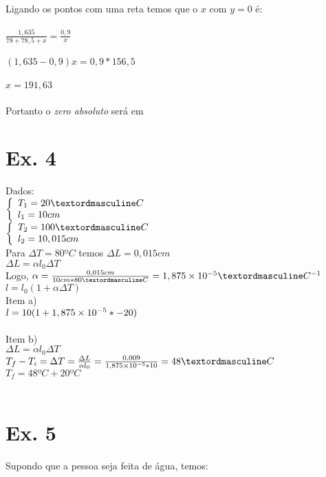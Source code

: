 Ligando os pontos com uma reta temos que o $x$ com $y=0$ é: \\ \\
$\frac{1,635}{78+78,5+x} = \frac{0,9}{x}$ \\ \\
$(1,635-0,9)x = 0,9 * 156,5$\\ \\
$x = 191,63$\\ \\

Portanto o \textit{zero absoluto} será em \\

\section{Ex. 4}

Dados: \\
$ \left\{
	  \begin{array}{l l}
		  T_{1} = 20ºC \\
		  l_{1}=10cm \\
	  \end{array}
  \right.
$ \\
$ \left\{
  	\begin{array}{l l}
		  T_{2} = 100ºC \\
		  l_{2}=10,015cm \\
	  \end{array}
  \right.
$ \\

Para $\Delta T=80ºC$ temos $\Delta L=0,015cm$\\
$\Delta L = \alpha l_{0}\Delta T$\\
Logo, $\alpha = \frac{0,015cm}{10cm*80ºC} = 1,875\e{-5}ºC^{-1}$\\
$ l = l_{0}(1 + \alpha\Delta T)$\\
Item a)\\
$l = 10(1+1,875\times 10^{-5}*-20)$\\
\\
Item b)\\
$\Delta L = \alpha l_{0}\Delta T$\\
$T_{f} - T_{i} = \Delta T = \frac{\Delta L}{\alpha l_{0}} = \frac{0,009}{1,875\e{-5}*10} = 48ºC$\\
$T_{f} = 48ºC + 20ºC$\\
\\

\section{Ex. 5}
Supondo que a pessoa seja feita de água, temos:


